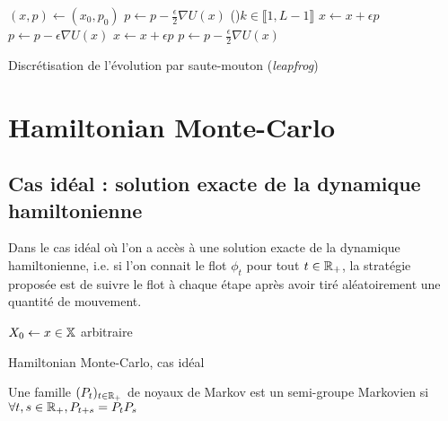\documentclass[10pt,a4paper]{article}
\begin{document}
\begin{center}
	\begin{algorithm}[H]
		$(x,p) \leftarrow (x_0,p_0)$\;
		$p \leftarrow p - \frac{\epsilon}{2} \nabla U(x)$ 
		\For(){$k \in \llbracket 1,L-1 \rrbracket$}{
			$x \leftarrow x + \epsilon p$\;
			$p \leftarrow p - \epsilon \nabla U(x)$\;
		}
		$x \leftarrow x + \epsilon p$ 
		$p \leftarrow p - \frac{\epsilon}{2} \nabla U(x)$ 
		\caption{Discrétisation de l'évolution par saute-mouton (\emph{leapfrog})}
		\label{algo:leapfrog}
	\end{algorithm}
\end{center}

\section{Hamiltonian Monte-Carlo}

\subsection{Cas idéal : solution exacte de la dynamique hamiltonienne}

Dans le cas idéal où l'on a accès à une solution exacte de la dynamique hamiltonienne, i.e. si l'on connait le flot $\phi_t$ pour tout $t \in \mathbb{R}_+$, la stratégie proposée est de suivre le flot à chaque étape après avoir tiré aléatoirement une quantité de mouvement.

\begin{center}
	\begin{algorithm}[H]
		$X_0 \leftarrow x \in \mathbb{X}$ arbitraire\;
		\caption{Hamiltonian Monte-Carlo, cas idéal}
		\label{algo:HMC-ideal}
	\end{algorithm}
\end{center}

\begin{Def}
	Une famille $(P_t)_{t \in \mathbb{R}_+}$ de noyaux de Markov est un semi-groupe Markovien si $\forall t,s \in \mathbb{R}_+, P_{t+s} = P_t P_s$
\end{Def}
\end{document}
